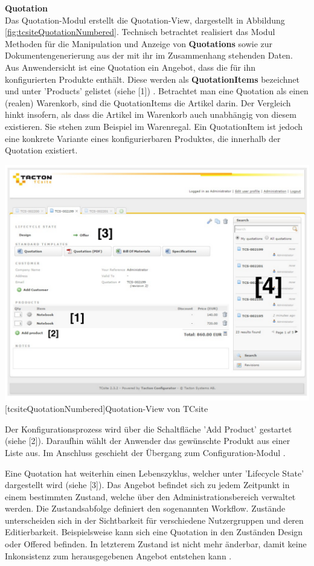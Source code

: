 \documentclass[12pt,a4paper,bibliography=totocnumbered,listof=totoc]{scrartcl}
\begin{document}
\textbf{Quotation}\\
Das Quotation-Modul erstellt die Quotation-View, dargestellt in Abbildung \ref{fig:tcsiteQuotationNumbered}. Technisch betrachtet realisiert das Modul Methoden für die Manipulation und Anzeige von \textbf{Quotations} sowie zur Dokumentengenerierung aus der mit ihr im Zusammenhang stehenden Daten. Aus Anwendersicht ist eine Quotation ein Angebot, dass die für ihn konfigurierten Produkte enthält. Diese werden als \textbf{QuotationItems} bezeichnet und unter 'Products' gelistet (siehe [1]) \citep{tactonTCsiteDevelopmentManual}. Betrachtet man eine Quotation als einen (realen) Warenkorb, sind die QuotationItems die Artikel darin. Der Vergleich hinkt insofern, als dass die Artikel im Warenkorb auch unabhängig von diesem existieren. Sie stehen zum Beispiel im Warenregal. Ein QuotationItem ist jedoch eine konkrete Variante eines konfigurierbaren Produktes, die innerhalb der Quotation existiert.

\vspace{1em}
\begin{minipage}{\linewidth}
	\centering
	\includegraphics[width=0.7\linewidth]{Abbildungen/tcsiteQuotationNumbered.pdf}
	[tcsiteQuotationNumbered]{Quotation-View von TCsite}
	\label{fig:tcsiteQuotationNumbered}
\end{minipage}
\vspace{1em}

Der Konfigurationsprozess wird über die Schaltfläche 'Add Product' gestartet (siehe [2]). Daraufhin wählt der Anwender das gewünschte Produkt aus einer Liste aus. Im Anschluss geschieht der Übergang zum Configuration-Modul \citep{tactonTCsiteReferenceManual}.

Eine Quotation hat weiterhin einen Lebenszyklus, welcher unter 'Lifecycle State' dargestellt wird (siehe [3]). Das Angebot befindet sich zu jedem Zeitpunkt in einem bestimmten Zustand, welche über den Administrationsbereich verwaltet werden. Die Zustandsabfolge definiert den sogenannten \glqq Workflow\grqq{}. Zustände unterscheiden sich in der Sichtbarkeit für verschiedene Nutzergruppen und deren Editierbarkeit. Beispielsweise kann sich eine Quotation in den Zuständen \glqq Design\grqq{} oder \glqq Offered\grqq{} befinden. In letzterem Zustand ist nicht mehr änderbar, damit keine Inkonsistenz zum herausgegebenen Angebot entstehen kann \citep{tactonTCsiteReferenceManual}.
\end{document}
